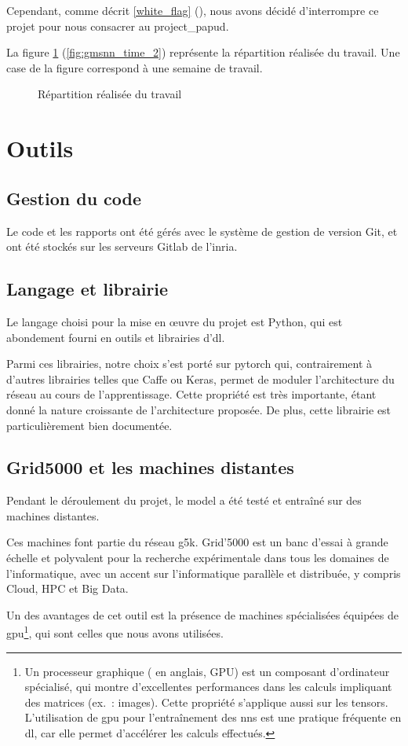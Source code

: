 Cependant, comme décrit \autoref{white_flag} (), nous avons décidé d'interrompre ce projet pour nous consacrer au \gls{project_papud}.

La figure \ref{fig:gmsnn_time_2} (\autoref{fig:gmsnn_time_2}) représente la répartition réalisée du travail. Une case de la figure correspond à une semaine de travail.

\begin{figure}[ht]
	\centering
	\caption{Répartition réalisée du travail}\label{fig:gmsnn_time_2}
\end{figure}

\pagebreak
\section{Outils}
\subsection{Gestion du code}
Le code et les rapports ont été gérés avec le système de gestion de version Git, et ont été stockés sur les serveurs Gitlab de l'\gls{inria}.

\subsection{Langage et librairie}
Le langage choisi pour la mise en œuvre du projet est Python, qui est abondement fourni en outils et librairies d'\gls{dl}.

Parmi ces librairies, notre choix s'est porté sur \gls{pytorch} qui, contrairement à d'autres librairies telles que Caffe ou Keras, permet de moduler l'architecture du réseau au cours de l'apprentissage. Cette propriété est très importante, étant donné la nature \og croissante\fg{} de l'architecture proposée. De plus, cette librairie est particulièrement bien documentée.

\subsection{Grid5000 et les machines distantes}
Pendant le déroulement du projet, le \gls{model} a été testé et entraîné sur des machines distantes.

Ces machines font partie du réseau \gls{g5k}.
\og Grid'5000 est un banc d'essai à grande échelle et polyvalent pour la recherche expérimentale dans tous les domaines de l'informatique, avec un accent sur l'informatique parallèle et distribuée, y compris Cloud, HPC et Big Data.\fg{}~\autocite{g5k}

Un des avantages de cet outil est la présence de machines spécialisées équipées de \gls{gpu}\footnote{Un processeur graphique ( en anglais, GPU) est un composant d'ordinateur spécialisé, qui montre d'excellentes performances dans les calculs impliquant des \glspl{matrice} (ex.~: images). Cette propriété s'applique aussi sur les \glspl{tensor}. L'utilisation de \gls{gpu} pour l'entraînement des \glspl{nn} est une pratique fréquente en \gls{dl}, car elle permet d'accélérer les calculs effectués.\label{def:gpu}}, qui sont celles que nous avons utilisées.